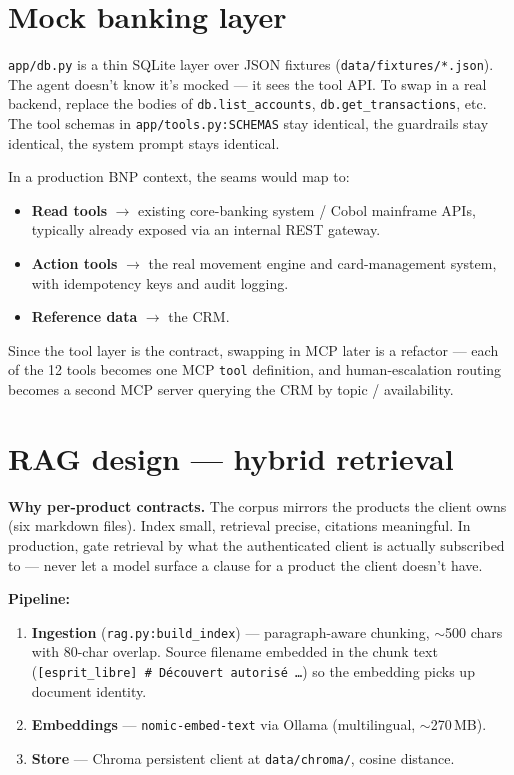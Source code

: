 \documentclass[11pt]{article}
\begin{document}
\section{Mock banking layer}

\texttt{app/db.py} is a thin SQLite layer over JSON fixtures (\texttt{data/fixtures/*.json}). The agent doesn't know it's mocked --- it sees the tool API. To swap in a real backend, replace the bodies of \texttt{db.list\_accounts}, \texttt{db.get\_transactions}, etc. The tool schemas in \texttt{app/tools.py:SCHEMAS} stay identical, the guardrails stay identical, the system prompt stays identical.

In a production BNP context, the seams would map to:

\begin{itemize}[leftmargin=*]
  \item \textbf{Read tools} $\rightarrow$ existing core-banking system / Cobol mainframe APIs, typically already exposed via an internal REST gateway.
  \item \textbf{Action tools} $\rightarrow$ the real movement engine and card-management system, with idempotency keys and audit logging.
  \item \textbf{Reference data} $\rightarrow$ the CRM.
\end{itemize}

Since the tool layer is the contract, swapping in MCP later is a refactor --- each of the 12 tools becomes one MCP \texttt{tool} definition, and human-escalation routing becomes a second MCP server querying the CRM by topic / availability.

\section{RAG design --- hybrid retrieval}

\textbf{Why per-product contracts.} The corpus mirrors the products the client owns (six markdown files). Index small, retrieval precise, citations meaningful. In production, gate retrieval by what the authenticated client is actually subscribed to --- never let a model surface a clause for a product the client doesn't have.

\textbf{Pipeline:}

\begin{enumerate}[leftmargin=*]
  \item \textbf{Ingestion} (\texttt{rag.py:build\_index}) --- paragraph-aware chunking, $\sim$500 chars with 80-char overlap. Source filename embedded in the chunk text (\texttt{[esprit\_libre] \# Découvert autorisé \ldots}) so the embedding picks up document identity.
  \item \textbf{Embeddings} --- \texttt{nomic-embed-text} via Ollama (multilingual, $\sim$270\,MB).
  \item \textbf{Store} --- Chroma persistent client at \texttt{data/chroma/}, cosine distance.
\end{enumerate}
\end{document}
